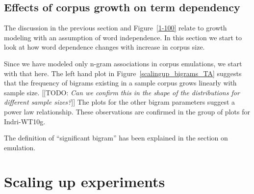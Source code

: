 \documentclass{sig-alternate}
\newcommand{\todo}[1]{{\color{blue}[[TODO: {\emph{#1}}]]}}
\newcommand{\IndriWT}{Indri-WT10g}
\newcommand{\PPS}{../From_Relsci/Experiments_sampling}
\begin{document}
\begin{figure*}[!ht]
\centering
   
   
\caption{Showing how bigram attributes of a corpus change with
  growth in corpus size for the \IndriWT~corpus.  Note that subfigure
  (a) is a linear plot while the others are log log.
  \label{scalingup_bigrams_WT}}
\end{figure*}



\subsection{Effects of corpus growth on term dependency}

The discussion in the previous section and Figure~\ref{1-100} relate
to growth modeling with an assumption of word independence.  In this
section we start to look at how word dependence changes with increase
in corpus size.

Since we have modeled only n-gram associations in corpus emulations,
we start with that here.  The left hand plot in Figure~\ref{scalingup_bigrams_TA} suggests that 
the frequency of bigrams existing in a sample corpus grows linearly
with sample size. \todo{Can we confirm this in the shape of the
  distributions for different sample sizes?} The plots for the other
bigram parameters suggest a power law relationship.  These
observations are confirmed in the group of plots for \IndriWT.

The definition of ``significant bigram'' has been explained in the
section on emulation.



\section{Scaling up experiments}  %
\label{SUExpts}
\end{document}
